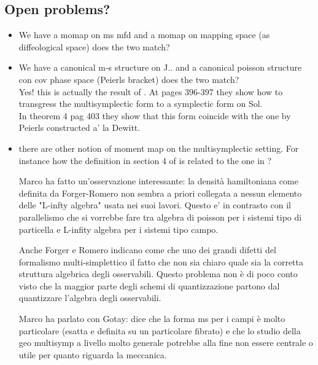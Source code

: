 \documentclass[a4paper,12pt,fleqn]{article}  %
\begin{document}
\subsection{Open problems?}
\begin{itemize}
	\item We have a momap on ms mfd and a momap on mapping space (as diffeological space) does the two match?
	\item We have a canonical m-s structure on J.. and a canonical poisson structure con cov phase space (Peierls bracket) does the two match? \\
		Yes! this is actually the result of \cite{forgeromero}. At pages 396-397 they show how to transgress the multisymplectic form to a symplectic form on Sol.\\
		In theorem 4 pag 403 they show that this form coincide with the one by Peierls constructed a' la Dewitt.

	\item there are other notion of moment map on the multisymplectic setting. For instance how the definition in section 4 of \cite{Gotay1998a} is related to the one in \cite{Ryvkin2018}?

Marco ha fatto un'osservazione interessante: la densità hamiltoniana come definita da Forger-Romero non sembra a priori collegata a nessun elemento delle "L-infty algebra" usata nei suoi lavori. Questo e' in contrasto con il parallelismo che si vorrebbe fare tra algebra di poisson per i sistemi tipo di particella e L-infity algebra per i sistemi tipo campo.

Anche Forger e Romero indicano come che uno dei grandi difetti del formalismo multi-simplettico il fatto che non sia chiaro quale sia la corretta struttura algebrica degli osservabili. Questo problema non è di poco conto visto che la maggior parte degli schemi di quantizzazione partono dal quantizzare l'algebra degli osservabili.

Marco ha parlato con Gotay: dice che la forma ms per i campi è molto particolare (esatta e definita su un particolare fibrato) e che lo studio della geo multisymp a livello molto generale potrebbe alla fine non essere centrale o utile per quanto riguarda la meccanica.	
	
\end{itemize}
	



			\nocite{*}
			
			
\end{document}
